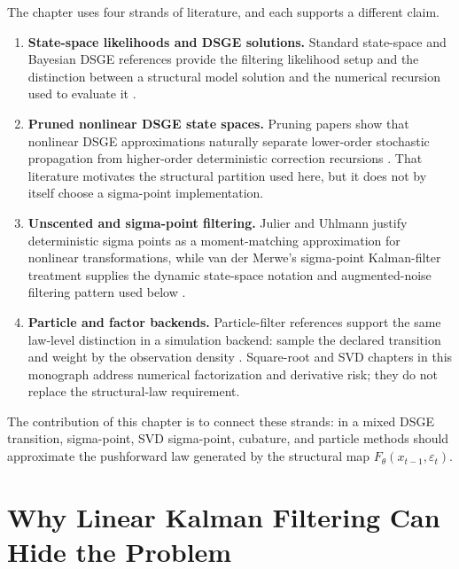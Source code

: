The chapter uses four strands of literature, and each supports a different
claim.
\begin{enumerate}[label=(\roman*)]
  \item \textbf{State-space likelihoods and DSGE solutions.}
    Standard state-space and Bayesian DSGE references provide the filtering
    likelihood setup and the distinction between a structural model solution
    and the numerical recursion used to evaluate it
    \citep{durbin2012time,herbst2015bayesian,an2007bayesian}.
  \item \textbf{Pruned nonlinear DSGE state spaces.}
    Pruning papers show that nonlinear DSGE approximations naturally separate
    lower-order stochastic propagation from higher-order deterministic
    correction recursions
    \citep{kim2008calculating,andreasen2018pruned}.  That literature motivates
    the structural partition used here, but it does not by itself choose a
    sigma-point implementation.
  \item \textbf{Unscented and sigma-point filtering.}
    Julier and Uhlmann justify deterministic sigma points as a moment-matching
    approximation for nonlinear transformations, while van der Merwe's
    sigma-point Kalman-filter treatment supplies the dynamic state-space
    notation and augmented-noise filtering pattern used below
    \citep{julier1996general,julier1997new,vandermerwe2004sigma}.
  \item \textbf{Particle and factor backends.}
    Particle-filter references support the same law-level distinction in a
    simulation backend: sample the declared transition and weight by the
    observation density
    \citep{gordon1993novel,doucet2001sequential,andrieu2010particle}.
    Square-root and SVD chapters in this monograph address numerical
    factorization and derivative risk; they do not replace the structural-law
    requirement.
\end{enumerate}
The contribution of this chapter is to connect these strands: in a mixed DSGE
transition, sigma-point, SVD sigma-point, cubature, and particle methods should
approximate the pushforward law generated by the structural map
$F_\theta(x_{t-1},\varepsilon_t)$.

\section{Why Linear Kalman Filtering Can Hide the Problem}
\label{sec:bf-linear-kalman-hides-structural-split}


